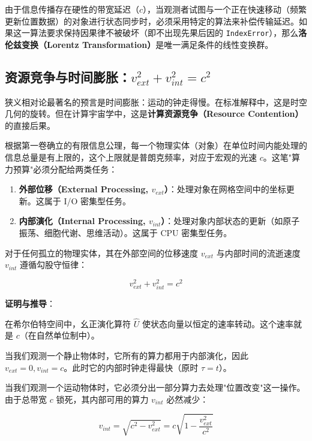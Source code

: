 由于信息传播存在硬性的带宽延迟（$c$），当观测者试图与一个正在快速移动（频繁更新位置数据）的对象进行状态同步时，必须采用特定的算法来补偿传输延迟。如果这一算法要求保持因果律不被破坏（即不出现先果后因的 \texttt{IndexError}），那么\textbf{洛伦兹变换（Lorentz Transformation）}是唯一满足条件的线性变换群。

\subsection{资源竞争与时间膨胀：$v_{ext}^2 + v_{int}^2 = c^2$}

狭义相对论最著名的预言是时间膨胀：运动的钟走得慢。在标准解释中，这是时空几何的旋转。但在计算宇宙学中，这是\textbf{计算资源竞争（Resource Contention）}的直接后果。

根据第一卷确立的有限信息公理，每一个物理实体（对象）在单位时间内能处理的信息总量是有上限的，这个上限就是普朗克频率，对应于宏观的光速 $c$。这笔"算力预算"必须分配给两类任务：

\begin{enumerate}
\item \textbf{外部位移（External Processing, $v_{ext}$）}：处理对象在网格空间中的坐标更新。这属于 I/O 密集型任务。

\item \textbf{内部演化（Internal Processing, $v_{int}$）}：处理对象内部状态的更新（如原子振荡、细胞代谢、思维活动）。这属于 CPU 密集型任务。
\end{enumerate}

\begin{theorem}
对于任何孤立的物理实体，其在外部空间的位移速度 $v_{ext}$ 与内部时间的流逝速度 $v_{int}$ 遵循勾股守恒律：

\begin{equation}
v_{ext}^2 + v_{int}^2 = c^2
\end{equation}
\end{theorem}

\textbf{证明与推导}：

在希尔伯特空间中，幺正演化算符 $\hat{U}$ 使状态向量以恒定的速率转动。这个速率就是 $c$（在自然单位制中）。

当我们观测一个静止物体时，它所有的算力都用于内部演化，因此 $v_{ext}=0, v_{int}=c$。此时它的内部时钟走得最快（原时 $\tau = t$）。

当我们观测一个运动物体时，它必须分出一部分算力去处理"位置改变"这一操作。由于总带宽 $c$ 锁死，其内部可用的算力 $v_{int}$ 必然减少：

\begin{equation}
v_{int} = \sqrt{c^2 - v_{ext}^2} = c \sqrt{1 - \frac{v_{ext}^2}{c^2}}
\end{equation}

